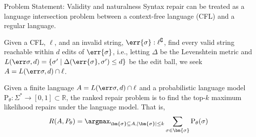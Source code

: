 \documentclass{beamer}
\newcommand{\hole}{\underline{\hspace{0.25cm}}}
\begin{document}
\begin{frame}[fragile]{Problem Statement: Validity and naturalness}
  Syntax repair can be treated as a language intersection problem between a context-free language (CFL) and a regular language.

  \begin{definition}
    Given a CFL, $\ell$, and an invalid string, $\err{\sigma}: \ell^\complement$, find every valid string reachable within $d$ edits of $\err{\sigma}$, i.e., letting $\Delta$ be the Levenshtein metric and $L(\err\sigma, d) = \{\sigma' \mid \Delta(\err{\sigma}, \sigma') \leq d\}$ be the edit ball, we seek $A = L(\err\sigma, d) \cap \ell$.
  \end{definition}

  \begin{definition}
  Given a finite language $A = L(\err\sigma, d) \cap \ell$ and a probabilistic language model $\text{P}_\theta: \Sigma^* \rightarrow [0, 1] \subset \mathbb{R}$, the ranked repair problem is to find the top-$k$ maximum likelihood repairs under the language model. That is,
  \begin{equation}
    R(A, P_\theta) = \argmax_{\bm{\sigma} \subseteq A, |\bm{\sigma}| \leq k} \sum_{\sigma \in \bm{\sigma}}\text{P}_\theta(\sigma)
  \end{equation}
    \end{definition}
%
\end{frame}
\end{document}
